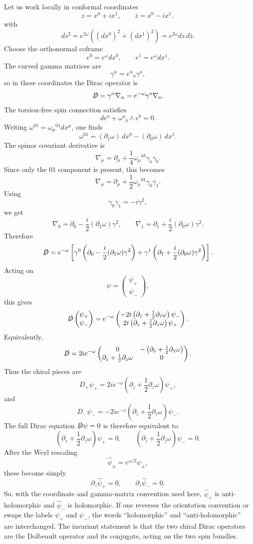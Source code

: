 \documentclass[
  10pt,
  a4paper,
  openany]{book}
\begin{document}
Let us work locally in conformal coordinates \[
z=x^0+ix^1,
\qquad
\bar z=x^0-ix^1,
\] with \[
ds^2=e^{2\omega}\left((dx^0)^2+(dx^1)^2\right)
=e^{2\omega}dz\,d\bar z.
\] Choose the orthonormal coframe \[
e^0=e^\omega dx^0,
\qquad
e^1=e^\omega dx^1.
\] The curved gamma matrices are \[
\gamma^\alpha=e^\alpha{}_a\gamma^a,
\] so in these coordinates the Dirac operator is \[
\slashed D
=
\gamma^\alpha\nabla_\alpha
=
e^{-\omega}\gamma^a\nabla_a.
\] The torsion-free spin connection satisfies \[
de^a+\omega^a{}_b\wedge e^b=0.
\] Writing \(\omega^{01}=\omega_\mu{}^{01}dx^\mu\), one finds \[
\omega^{01}
=
(\partial_1\omega)\,dx^0-(\partial_0\omega)\,dx^1.
\] The spinor covariant derivative is \[
\nabla_\mu
=
\partial_\mu+\frac{1}{4}\omega_\mu{}^{ab}\gamma_a\gamma_b.
\] Since only the \(01\) component is present, this becomes \[
\nabla_\mu
=
\partial_\mu+\frac{1}{2}\omega_\mu{}^{01}\gamma_0\gamma_1.
\] Using \[
\gamma_0\gamma_1=-i\gamma^2,
\] we get \[
\nabla_0
=
\partial_0-\frac{i}{2}(\partial_1\omega)\gamma^2,
\qquad
\nabla_1
=
\partial_1+\frac{i}{2}(\partial_0\omega)\gamma^2.
\] Therefore \[
\slashed D
=
e^{-\omega}\left[
\gamma^0\left(\partial_0-\frac{i}{2}(\partial_1\omega)\gamma^2\right)
+
\gamma^1\left(\partial_1+\frac{i}{2}(\partial_0\omega)\gamma^2\right)
\right].
\] Acting on \[
\psi=
\begin{pmatrix}
\psi_+\\
\psi_-
\end{pmatrix},
\] this gives \[
\slashed D
\begin{pmatrix}
\psi_+\\
\psi_-
\end{pmatrix}
=
e^{-\omega}
\begin{pmatrix}
-2i\left(\partial_{\bar z}+\frac{1}{2}\partial_{\bar z}\omega\right)\psi_-\\
2i\left(\partial_z+\frac{1}{2}\partial_z\omega\right)\psi_+
\end{pmatrix}.
\] Equivalently, \[
\slashed D
=
2i e^{-\omega}
\begin{pmatrix}
0 & -\left(\partial_{\bar z}+\frac{1}{2}\partial_{\bar z}\omega\right)\\
\partial_z+\frac{1}{2}\partial_z\omega & 0
\end{pmatrix}.
\] Thus the chiral pieces are \[
D_+\psi_+
=
2i e^{-\omega}
\left(\partial_z+\frac{1}{2}\partial_z\omega\right)\psi_+,
\] and \[
D_-\psi_-
=
-2i e^{-\omega}
\left(\partial_{\bar z}+\frac{1}{2}\partial_{\bar z}\omega\right)\psi_-.
\] The full Dirac equation \(\slashed D\psi=0\) is therefore equivalent
to \[
\left(\partial_z+\frac{1}{2}\partial_z\omega\right)\psi_+=0,
\qquad
\left(\partial_{\bar z}+\frac{1}{2}\partial_{\bar z}\omega\right)\psi_-=0.
\] After the Weyl rescaling \[
\widehat\psi_\pm=e^{\omega/2}\psi_\pm,
\] these become simply \[
\partial_z\widehat\psi_+=0,
\qquad
\partial_{\bar z}\widehat\psi_-=0.
\] So, with the coordinate and gamma-matrix convention used here,
\(\widehat\psi_+\) is anti-holomorphic and \(\widehat\psi_-\) is
holomorphic. If one reverses the orientation convention or swaps the
labels \(\psi_+\) and \(\psi_-\), the words ``holomorphic'' and
``anti-holomorphic'' are interchanged. The invariant statement is that
the two chiral Dirac operators are the Dolbeault operator and its
conjugate, acting on the two spin bundles.
\end{document}
